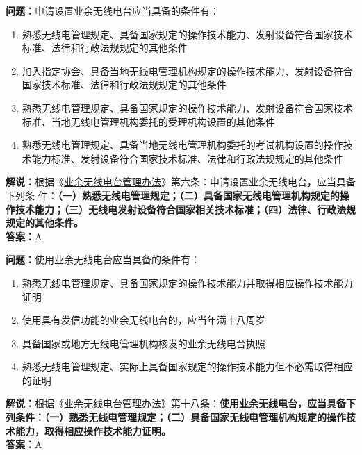 \textbf{问题：}申请设置业余无线电台应当具备的条件有：
\begin{enumerate}[label=\Alph*), leftmargin=1cm]
	\item 熟悉无线电管理规定、具备国家规定的操作技术能力、发射设备符合国家技术标准、法律和行政法规规定的其他条件
	\item 加入指定协会、具备当地无线电管理机构规定的操作技术能力、发射设备符合国家技术标准、法律和行政法规规定的其他条件
	\item 熟悉无线电管理规定、具备国家规定的操作技术能力、发射设备符合国家技术标准、当地无线电管理机构委托的受理机构设置的其他条件
	\item 熟悉无线电管理规定、具备当地无线电管理机构委托的考试机构设置的操作技术能力标准、发射设备符合国家技术标准、法律和行政法规规定的其他条件
\end{enumerate}
\textbf{解说：}根据《\href{https://www.miit.gov.cn/jgsj/zfs/bmgz/art/2020/art_147b69815b3641caad9047735f94c860.html}{业余无线电台管理办法}》第六条：申请设置业余无线电台，应当具备下列条
件：\textbf{（一）熟悉无线电管理规定；（二）具备国家无线电管理机构规定的操作技术能力；（三）无线电发射设备符合国家相关技术标准；（四）法律、行政法规规定的其他条件。}\\\textbf{答案：}A

\textbf{问题：}使用业余无线电台应当具备的条件有：
\begin{enumerate}[label=\Alph*), leftmargin=1cm]
	\item 熟悉无线电管理规定、具备国家规定的操作技术能力并取得相应操作技术能力证明
	\item 使用具有发信功能的业余无线电台的，应当年满十八周岁
	\item 具备国家或地方无线电管理机构核发的业余无线电台执照
	\item 熟悉无线电管理规定、实际上具备国家规定的操作技术能力但不必需取得相应的证明
\end{enumerate}
\textbf{解说：}根据《\href{https://www.miit.gov.cn/jgsj/zfs/bmgz/art/2020/art_147b69815b3641caad9047735f94c860.html}{业余无线电台管理办法}》第十八条：\textbf{使用业余无线电台，应当具备下列条件：（一）熟悉无线电管理规定；（二）具备国家无线电管理机构规定的操作技术能力，取得相应操作技术能力证明。}\\\textbf{答案：}A

